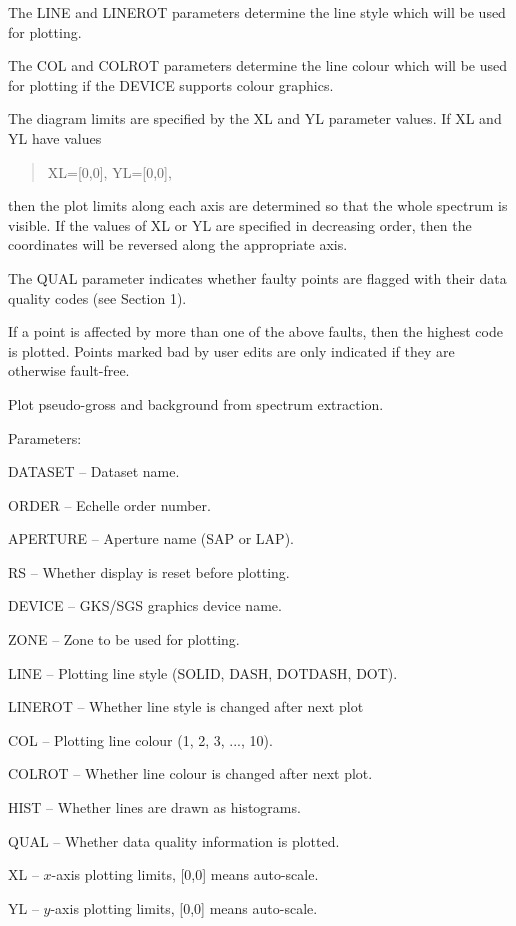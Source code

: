 \begin {description}
\begin {description}
The LINE and LINEROT parameters determine the line style which will be
used for plotting.

The COL and COLROT parameters determine the line colour which will be used
for plotting if the DEVICE supports colour graphics.

The diagram limits are specified by the XL and YL parameter values.
If XL and YL have values

\begin {quote}
XL=[0,0], YL=[0,0],
\end {quote}
then the plot limits along each axis are determined so that the whole
spectrum is visible.
If the values of XL or YL are specified in decreasing order, then
the coordinates will be reversed along the appropriate axis.

The QUAL parameter indicates whether faulty points are flagged with
their data quality codes (see Section 1).

If a point is affected by more than one of the above faults, then
the highest code is plotted.
Points marked bad by user edits are only indicated if they are otherwise
fault-free.
\end {description}

\item [PLGRS]
Plot pseudo-gross and background from spectrum extraction.

\begin {description}
\item Parameters:

\begin {description}
\item DATASET -- Dataset name.
\item ORDER -- Echelle order number.
\item APERTURE -- Aperture name (SAP or LAP).
\item RS -- Whether display is reset before plotting.
\item DEVICE -- GKS/SGS graphics device name.
\item ZONE -- Zone to be used for plotting.
\item LINE -- Plotting line style (SOLID, DASH, DOTDASH, DOT).
\item LINEROT -- Whether line style is changed after next plot
\item COL -- Plotting line colour (1, 2, 3, ..., 10).
\item COLROT -- Whether line colour is changed after next plot.
\item HIST -- Whether lines are drawn as histograms.
\item QUAL -- Whether data quality information is plotted.
\item XL -- $x$-axis plotting limits, [0,0] means auto-scale.
\item YL -- $y$-axis plotting limits, [0,0] means auto-scale.
\end {description}


\end{description}
\end{description}
